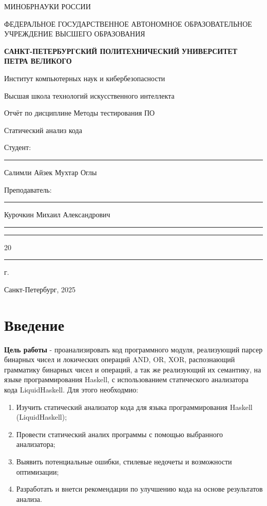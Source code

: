 \documentclass[areasetadvanced]{scrartcl}
\begin{document}
	\thispagestyle{empty}
	\begin{center}
		\large{МИНОБРНАУКИ РОССИИ} \par
		\vspace{0.3cm}
		\normalsize
		{ФЕДЕРАЛЬНОЕ ГОСУДАРСТВЕННОЕ АВТОНОМНОЕ ОБРАЗОВАТЕЛЬНОЕ УЧРЕЖДЕНИЕ ВЫСШЕГО ОБРАЗОВАНИЯ} \par
		\vspace{0.3cm}
		\textbf{\guillemotleft САНКТ-ПЕТЕРБУРГСКИЙ ПОЛИТЕХНИЧЕСКИЙ}
		\textbf{УНИВЕРСИТЕТ ПЕТРА ВЕЛИКОГО\guillemotright} \par
		\vspace{0.3cm}
		{Институт компьютерных наук и кибербезопасности}\par
		{Высшая школа технологий искусственного интеллекта}\par
	\end{center}
	\vfill
	\begin{center}
		{\large Отчёт по дисциплине \guillemotleft Методы тестирования ПО\guillemotright}\par
		{\huge   Статический анализ кода }
	\end{center}
	\vfill
	\begin{flushleft}
		Студент: \hspace{1.8cm} \rule[0pt]{2.5cm}{0.5pt}\hfill Салимли Айзек Мухтар Оглы\par
		\vspace{1.5cm}
		Преподаватель: \hspace{0.55cm} \rule[0pt]{2.5cm}{0.5pt}\hfill  Курочкин Михаил Александрович
	\end{flushleft}
	\vspace{0.5cm}
	\begin{flushright}
		\guillemotleft \rule[0pt]{0.8cm}{0.5pt}\guillemotright \rule[0pt]{2cm}{0.5pt} 20\rule[0pt]{0.5cm}{0.5pt} г.
	\end{flushright}
	\vfill
	\begin{center}
		Санкт-Петербург, 2025
	\end{center}
	\newpage
	\tableofcontents
	\newpage
\section*{Введение}

\textbf{Цель работы} - проанализировать код программного модуля, реализующий парсер бинарных чисел и локических операций AND, OR, XOR, распознающий грамматику бинарных чисел и операций, а так же реализующий их семантику, на языке программирования Haskell, с использованием статического анализатора кода LiquidHaskell. 
Для этого необходмио:
\begin{enumerate}
    \item Изучить статический анализатор кода для языка программирования Haskell (LiquidHaskell);
    \item Провести статический аналих программы с помощью выбранного анализатора;
    \item Выявить потенциальные ошибки, стилевые недочеты и возможности оптимизации;
    \item Разработать и внетси рекомендации по улучшению кода на основе результатов анализа.
\end{enumerate}
\newpage
\end{document}

